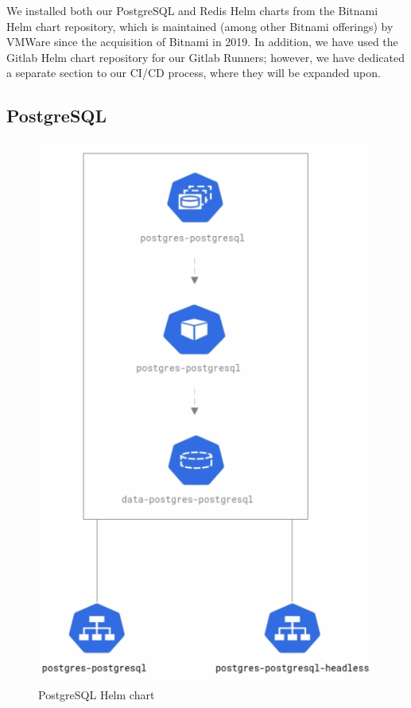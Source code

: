 \documentclass[thesis=B,english]{FITthesis}[2019/12/23]
\begin{document}
We installed both our PostgreSQL and Redis Helm charts from the Bitnami Helm chart repository, which is maintained (among other Bitnami offerings) by VMWare since the acquisition of Bitnami in 2019. \cite{bitnami} In addition, we have used the Gitlab Helm chart repository for our Gitlab Runners; however, we have dedicated a separate section to our CI/CD process, where they will be expanded upon.

\clearpage

\subsection{PostgreSQL}

\begin{figure}[H]
\centering
\caption{PostgreSQL Helm chart}
\hspace*{0.4cm}
\includegraphics[scale=0.6]{postgres-diagram}
\end{figure}
\end{document}
